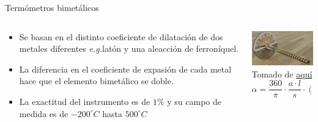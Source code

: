 \documentclass[aspectratio=169]{beamer}
\begin{document}
\begin{frame}{Termómetros bimetálicos}
    \begin{columns}[c, onlytextwidth]
        \begin{column}{0.5\textwidth}
            \begin{itemize}
                \item Se basan en el distinto coeficiente de dilatación de dos metales diferentes \textit{e.g.}latón y una aleacción de ferroníquel. 
                \item La diferencia en el coeficiente de expasión de cada metal hace que el elemento bimetálico se doble. 
                \item La exactitud del instrumento es de $1\%$ y su campo de medida es de $-200^\circ C$ hasta $500^\circ C$
            \end{itemize}
        \end{column}
        \begin{column}{0.45\textwidth}
            \centering
            \includegraphics[width=5cm]{fig/bimetalic.png}
             \\ \tiny{Tomado de \href{https://natstuk.com/?p=786}{aquí}}
        \begin{equation*}
                \alpha = \dfrac{360}{\pi}\cdot \dfrac{a \cdot l}{s}\cdot (t_2-t_1) 
        \end{equation*}
        \end{column}
    \end{columns}
\end{frame}
\end{document}

